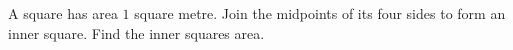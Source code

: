 A square has area $1$ square metre. Join the midpoints of its four sides to form an inner square. Find the inner square\textquotesingle s area.
